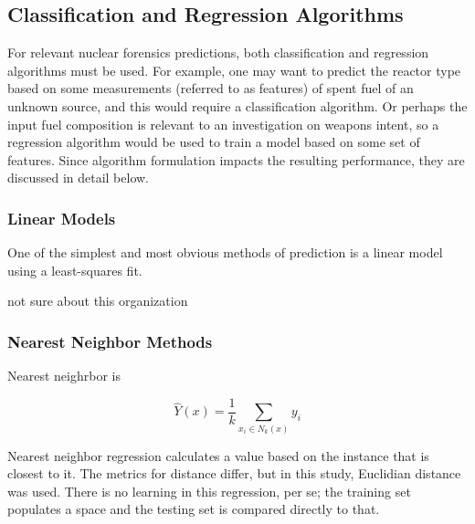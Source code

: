 \subsection{Classification and Regression Algorithms}
\label{sec:algs}

For relevant nuclear forensics predictions, both classification and regression
algorithms must be used.  For example, one may want to predict the reactor type
based on some measurements (referred to as features) of spent fuel of an
unknown source, and this would require a classification algorithm. Or perhaps
the input fuel composition is relevant to an investigation on weapons intent,
so a regression algorithm would be used to train a model based on some set of
features.  Since algorithm formulation impacts the resulting performance, they
are discussed in detail below.  


\subsubsection{Linear Models}
\label{sec:linear}

One of the simplest and most obvious methods of prediction is a linear model using a least-squares 
fit. 





not sure about this organization

\subsubsection{Nearest Neighbor Methods}
\label{sec:neighbor}

Nearest neighrbor is 



\begin{equation}
\hat{Y}(x) = \frac{1}{k} \sum_{x_i \in N_k(x)} y_i
\end{equation}

Nearest neighbor regression calculates a value based on the instance that is
closest to it. The metrics for distance differ, but in this study, Euclidian
distance was used. There is no learning in this regression, per se; the
training set populates a space and the testing set is compared directly to
that. \cite{elements_stats} 


